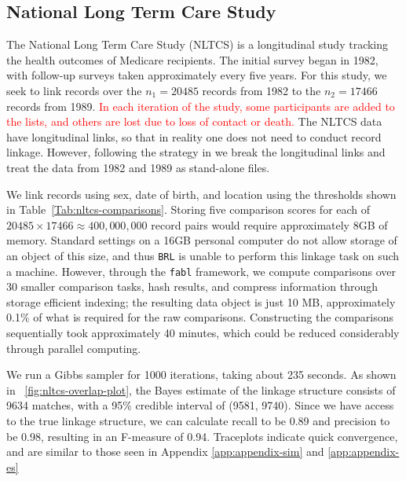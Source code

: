 \documentclass[ba]{imsart}
\begin{document}
	\subsection{National Long Term Care Study}
	\label{nltcs}
	
	The National Long Term Care Study (NLTCS) is a longitudinal study tracking the health outcomes of Medicare recipients. The initial survey began in 1982, with follow-up surveys taken approximately every five years. For this study, we seek to link records over the $n_1 = 20485$ records from 1982 to the $n_2 = 17466$ records from 1989. \textcolor{red}{In each iteration of the study, some participants are added to the lists, and others are lost due to loss of contact or death.} The NLTCS data have longitudinal links, so that in reality one does not need to conduct record linkage.  However, following the strategy in \cite{guha:reiter:BA} we break the longitudinal links and treat the data from 1982 and 1989 as stand-alone files.
	
	We link records using sex, date of birth, and location using the thresholds shown in Table~\ref{Tab:nltcs-comparisons}. Storing five comparison scores for each of $20485 \times 17466 \approx 400,000,000$ record pairs would require approximately 8GB of memory. Standard settings on a 16GB personal computer do not allow storage of an object of this size, and thus \texttt{BRL} is unable to perform this linkage task on such a machine. However, through the \texttt{fabl} framework, we compute comparisons over 30 smaller comparison tasks, hash results, and compress information through storage efficient indexing; the resulting data object is just 10 MB, approximately 0.1\% of what is required for the raw comparisons. Constructing the comparisons sequentially took approximately 40 minutes, which could be reduced considerably through parallel computing. 
	
	We run a Gibbs sampler for 1000 iterations, taking about 235 seconds. As shown in ~\ref{fig:nltcs-overlap-plot}, the Bayes estimate of the linkage structure consists of 9634 matches, with a 95\% credible interval of (9581, 9740). Since we have access to the true linkage structure, we can calculate recall to be 0.89 and precision to be 0.98, resulting in an F-measure of 0.94. Traceplots indicate quick convergence, and are similar to those seen in Appendix \ref{app:appendix-sim} and \ref{app:appendix-es}
	
\end{document}
